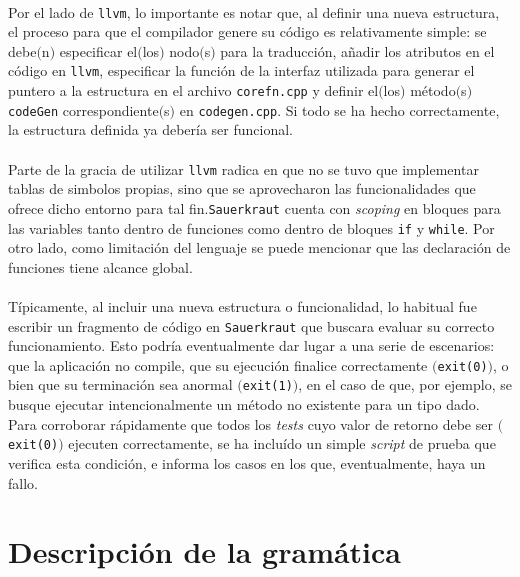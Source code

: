 \documentclass[12pt]{article}
\begin{document}
	\paragraph{} Por el lado de \verb|llvm|, lo importante es notar que, al definir una nueva estructura, el proceso para que el compilador genere su código es relativamente simple: se debe$($n$)$ especificar el$($los$)$ nodo$($s$)$ para la traducción, añadir los atributos en el código en \verb|llvm|, especificar la función de la interfaz utilizada para generar el puntero a la estructura en el archivo \verb|corefn.cpp| y definir el$($los$)$ método$($s$)$ \verb|codeGen| correspondiente$($s$)$ en \verb|codegen.cpp|. Si todo se ha hecho correctamente, la estructura definida ya debería ser funcional. 
	
	\paragraph{} Parte de la gracia de utilizar \verb|llvm| radica en que no se tuvo que implementar tablas de simbolos propias, sino que se aprovecharon las funcionalidades que ofrece dicho entorno para tal fin.\verb|Sauerkraut| cuenta con \textit{scoping} en bloques para las variables tanto dentro de funciones como dentro de bloques \verb|if| y \verb|while|. Por otro lado, como limitación del lenguaje se puede mencionar que las declaración de funciones tiene alcance global.
	
	\paragraph{} Típicamente, al incluir una nueva estructura o funcionalidad, lo habitual fue escribir un fragmento de código en \verb|Sauerkraut| que buscara evaluar su correcto funcionamiento. Esto podría eventualmente dar lugar a una serie de escenarios: que la aplicación no compile, que su ejecución finalice correctamente $($\verb|exit(0)|$)$, o bien que su terminación sea anormal $($\verb|exit(1)|$)$, en el caso de que, por ejemplo, se busque ejecutar intencionalmente un método no existente para un tipo dado. Para corroborar rápidamente que todos los \textit{tests} cuyo valor de retorno debe ser $($\verb|exit(0)|$)$ ejecuten correctamente, se ha incluído un simple \textit{script} de prueba que verifica esta condición, e informa los casos en los que, eventualmente, haya un fallo.
	
	\section{Descripción de la gramática}
	
\end{document}
